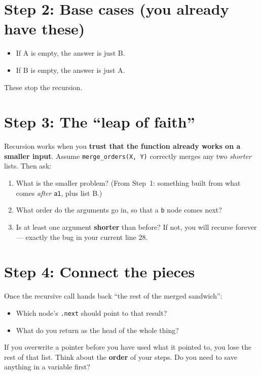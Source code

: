 \documentclass[11pt]{article}
\begin{document}
\section*{Step 2: Base cases \textcolor{green!50!black}{(you already have these)}}

\begin{itemize}[nosep]
  \item If A is empty, the answer is just B.
  \item If B is empty, the answer is just A.
\end{itemize}
These stop the recursion.

\section*{Step 3: The ``leap of faith''}

Recursion works when you \textbf{trust that the function already works on a smaller
input}. Assume \texttt{merge\_orders(X, Y)} correctly merges any two
\emph{shorter} lists. Then ask:

\begin{enumerate}[nosep]
  \item What is the smaller problem? (From Step~1: something built from what comes
        \emph{after} \texttt{a1}, plus list B.)
  \item What order do the arguments go in, so that a \texttt{b} node comes next?
  \item Is at least one argument \textbf{shorter} than before? If not, you will
        recurse forever --- exactly the bug in your current line 28.
\end{enumerate}

\section*{Step 4: Connect the pieces}

Once the recursive call hands back ``the rest of the merged sandwich'':

\begin{question}
\begin{itemize}[nosep, leftmargin=*]
  \item Which node's \texttt{.next} should point to that result?
  \item What do you return as the head of the whole thing?
\end{itemize}
\end{question}

\begin{warn}
If you overwrite a pointer before you have used what it pointed to, you lose the
rest of that list. Think about the \textbf{order} of your steps. Do you need to
save anything in a variable first?
\end{warn}
\end{document}

